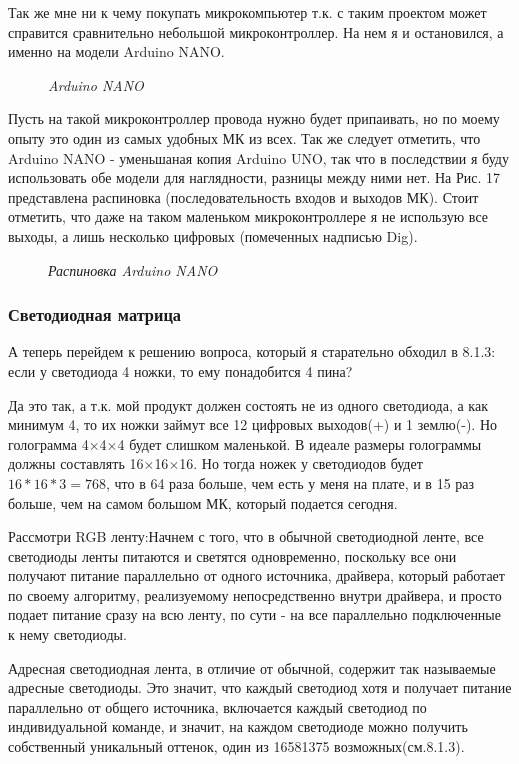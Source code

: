 \documentclass[a4paper, 12pt]{article}
\newcommand{\image}[3]{
	\begin{figure}[ht]
		\center{\texttt{[image: img/\#1]} }
		\caption{\textit{#3}}\end{figure}
}
\begin{document}
Так же мне ни к чему покупать микрокомпьютер т.к. с таким проектом может
справится сравнительно небольшой микроконтроллер. На нем я и остановился, а
именно на модели Arduino NANO.

\image{дуня нано2.jpg}{140}{Arduino NANO}

Пусть на такой микроконтроллер провода нужно будет припаивать, но по моему
опыту это один из самых удобных МК из всех. Так же следует отметить, что
Arduino NANO - уменьшаная копия Arduino UNO, так что в последствии я буду
использовать обе модели для наглядности, разницы между ними нет. На Рис. 17
представлена распиновка (последовательность входов и выходов МК). Стоит
отметить, что даже на таком маленьком микроконтроллере я не использую все
выходы, а лишь несколько цифровых (помеченных надписью Dig).

\image{дуня нано.jpg}{150}{Распиновка Arduino NANO}

\subsubsection{Светодиодная матрица}

А теперь перейдем к решению вопроса, который я старательно обходил в 8.1.3:
если у светодиода 4 ножки, то ему понадобится 4 пина?

Да это так, а т.к. мой продукт должен состоять не из одного светодиода, а
как минимум 4, то их ножки займут все 12 цифровых выходов(+) и 1 землю(-).
Но голограмма 4$\times$4$\times$4 будет слишком маленькой. В идеале размеры
голограммы должны составлять 16$\times$16$\times$16. Но тогда ножек у
светодиодов будет $16*16*3=768$, что в 64 раза больше, чем есть у меня на
плате, и в 15 раз больше, чем на самом большом МК, который подается сегодня.

Рассмотри RGB ленту:Начнем с того, что в обычной светодиодной ленте, все светодиоды ленты
питаются и светятся одновременно, поскольку все они получают питание
параллельно от одного источника, драйвера, который работает по своему алгоритму, реализуемому
непосредственно внутри драйвера, и просто подает питание сразу на всю ленту, по сути - на все
параллельно подключенные к нему светодиоды.

Адресная светодиодная лента, в отличие от обычной, содержит так называемые адресные
светодиоды. Это значит, что каждый светодиод хотя и получает питание параллельно от
общего источника, включается каждый светодиод по индивидуальной команде, и значит,
на каждом светодиоде можно получить собственный уникальный оттенок, один из 16581375
возможных(см.8.1.3).
\end{document}
